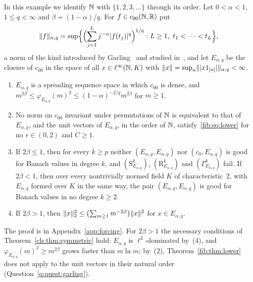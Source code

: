 \begin{example}\label{cls:ex:garling}
In this example we identify $\mathbb N$ with $\{1,2,3,\dots\}$ through its order. Let $0<\alpha<1$, $1\le q<\infty$ and
$\beta=(1-\alpha)/q$. For $f\in c_{00}(\mathbb N,\mathbb R)$ put
\[
 \norm f_{\alpha,q}=\sup\Bigl\{\Bigl(\sum_{j=1}^Lj^{-\alpha}\abs{f(t_j)}^q\Bigr)^{1/q}:L\ge1,\ t_1<\dots<t_L\Bigr\},
\]
a norm of the kind introduced by Garling~\cite{Ga} and studied in~\cite{AAW}, and let $E_{\alpha,q}$ be the closure of $c_{00}$ in the space
of all $x\in\ell^\infty(\mathbb N,K)$ with $\lVert x\rVert=\sup_n\lVert \lvert x1_{[n]}\rvert\rVert_{\alpha,q}<\infty$.
\begin{enumerate}
\item $E_{\alpha,q}$ is a spreading sequence space in which $c_{00}$ is dense, and
$m^{2\beta}\le\varphi_{E_{\alpha,q}}(m)^2\le(1-\alpha)^{-2/q}m^{2\beta}$ for $m\ge1$.
\item No norm on $c_{00}$ invariant under permutations of $\mathbb N$ is equivalent to that of $E_{\alpha,q}$, and the unit
vectors of $E_{\alpha,q}$, in the order of $\mathbb N$, satisfy~\eqref{fib:eq:lower} for no $r\in(0,2)$ and $C\ge1$.
\item If $2\beta\le1$, then for every $k\ge p$ neither $(E_{\alpha,q},E_{\alpha,q})$ nor $(c_0,E_{\alpha,q})$ is good for
Banach values in degree $k$, and $(\mathrm S^k_{E_{\alpha,q}})$, $(\mathrm R^k_{E_{\alpha,q}})$ and
$(\Gamma^k_{E_{\alpha,q}})$ fail. If $2\beta<1$, then over every nontrivially normed field $K$ of characteristic~$2$,
with $E_{\alpha,q}$ formed over $K$ in the same way, the pair $(E_{\alpha,q},E_{\alpha,q})$ is good for Banach values in no
degree $k\ge2$.
\item If $2\beta>1$, then $\lVert x\rVert_2^2\le\bigl(\sum_{m\ge1}m^{-2\beta}\bigr)\lVert x\rVert^2$ for $x\in E_{\alpha,q}$.
\end{enumerate}
\end{example}

The proof is in Appendix~\ref{app:forcing}. For $2\beta>1$ the necessary conditions of Theorem~\ref{cls:thm:symmetric}
hold: $E_{\alpha,q}$ is $\ell^2$\nobreakdash-dominated by~(4), and $\varphi_{E_{\alpha,q}}(m)^2\ge m^{2\beta}$ grows faster than
$m\ln m$; by~(2), Theorem~\ref{fib:thm:lower} does not apply to the unit vectors in their natural order
(Question~\ref{q:quest:garling}).
